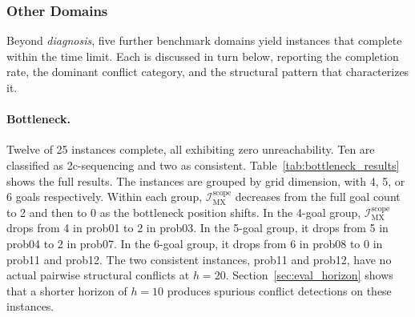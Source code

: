 \subsubsection{Other Domains}

Beyond \textit{diagnosis}, five further benchmark domains yield instances that complete within the time limit. Each is discussed in turn below, reporting the completion rate, the dominant conflict category, and the structural pattern that characterizes it.

\paragraph{Bottleneck.} Twelve of 25 instances complete, all exhibiting zero unreachability. Ten are classified as 2c-sequencing and two as consistent. Table~\ref{tab:bottleneck_results} shows the full results. The instances are grouped by grid dimension, with 4, 5, or 6 goals respectively. Within each group, $\mathcal{I}^{\text{scope}}_{\text{MX}}$ decreases from the full goal count to 2 and then to 0 as the bottleneck position shifts. In the 4-goal group, $\mathcal{I}^{\text{scope}}_{\text{MX}}$ drops from 4 in prob01 to 2 in prob03. In the 5-goal group, it drops from 5 in prob04 to 2 in prob07. In the 6-goal group, it drops from 6 in prob08 to 0 in prob11 and prob12. The two consistent instances, prob11 and prob12, have no actual pairwise structural conflicts at $h = 20$. Section~\ref{sec:eval_horizon} shows that a shorter horizon of $h = 10$ produces spurious conflict detections on these instances.

